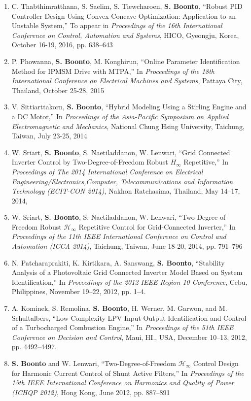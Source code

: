 \documentclass[10pt]{article}
\begin{document}
\begin{enumerate}
    \item C. Thabthimratthana, S. Saelim, S. Tiewcharoen, \textbf{S. Boonto}, ``Robust PID Controller Design Using Convex-Concave Optimization: Application to an Unstable System,'' To appear in \emph{Proceedings of  the 16th International Conference on Control, Automation and Systems}, HICO, Gyeongju, Korea, October 16-19, 2016, pp. 638--643
    \item P. Phowanna, \textbf{S. Boonto},  M. Konghirun, ``Online Parameter Identification Method for IPMSM Drive with MTPA,'' In \emph{Proceedings of  the 18th International Conference on Electrical Machines and Systems}, Pattaya City, Thailand, October 25-28, 2015
    \item V. Sittiarttakorn, \textbf{S. Boonto}, ``Hybrid Modeling Using a Stirling Engine and a {DC} Motor,'' In \emph{Proceedings of the Asia-Pacific Symposium on Applied Electromagnetic and Mechanics}, National Chung Hsing University, Taichung, Taiwan, July 23-25, 2014
    \item W. Sriart, \textbf{S. Boonto}, S. Naetiladdanon, W. Lenwari, ``Grid Connected Inverter Control by Two-Degree-of-Freedom Robust $H_\infty$ Repetitive,'' In \emph{Proceedings of The 2014 International Conference on Electrical Engineering/Electronics,Computer, Telecommunications and Information Technology (ECIT-CON 2014)}, Nakhon Ratchasima, Thailand, May 14--17, 2014,
    \item W. Sriart, \textbf{S. Boonto}, S. Naetiladdanon, W. Lenwari, ``Two-Degree-of-Freedom Robust $\mathcal{H}_\infty$ Repetitive Control for Grid-Connected Inverter,'' In \emph{Proceedings of the 11th IEEE International Conference on Control and Automation (ICCA 2014)}, Taichung, Taiwan, June 18-20, 2014, pp. 791--796
    \item N. Patcharaprakiti, K. Kirtikara, A. Sanswang, \textbf{S. Boonto}, ``Stability Analysis of a Photovoltaic Grid Connected Inverter Model Based on System Identification,'' In \emph{Proceedings of the 2012 IEEE Region 10 Conference}, Cebu, Philippines, November 19--22, 2012, pp. 1--4.
    \item {A. Kominek, S. Remolina, \textbf{S. Boonto}, H.  Werner, M. Garwon, and M. Schultalbers, ``Low-Complexity LPV Input-Output Identification and Control of a Turbocharged Combustion Engine,'' In \emph{Proceedings of the 51th IEEE Conference on Decision and Control}, Maui, HI., USA, December 10--13, 2012, pp. 4492--4497.}
    \item {\textbf{S. Boonto} and W. Lenwari, ``Two-Degree-of-Freedom $\mathcal{H}_{\infty}$ Control Design for Harmonic Current Control of Shunt Active Filters,'' In \emph{Proceedings of the 15th IEEE International Conference on Harmonics and Quality of Power (ICHQP 2012)}, Hong Kong, June 2012, pp. 887--891}

\end{enumerate}
\end{document}
